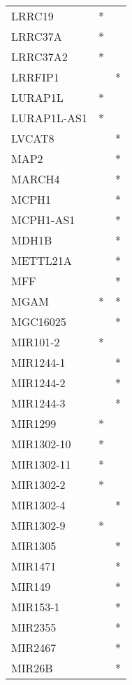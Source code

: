 \begin{longtable}{lcc}
LRRC19         &         * &         \\
LRRC37A        &         * &         \\
LRRC37A2       &         * &         \\
LRRFIP1        &           &       * \\
LURAP1L        &         * &         \\
LURAP1L-AS1    &         * &         \\
LVCAT8         &           &       * \\
MAP2           &           &       * \\
MARCH4         &           &       * \\
MCPH1          &           &       * \\
MCPH1-AS1      &           &       * \\
MDH1B          &           &       * \\
METTL21A       &           &       * \\
MFF            &           &       * \\
MGAM           &         * &       * \\
MGC16025       &           &       * \\
MIR101-2       &         * &         \\
MIR1244-1      &           &       * \\
MIR1244-2      &           &       * \\
MIR1244-3      &           &       * \\
MIR1299        &         * &         \\
MIR1302-10     &         * &         \\
MIR1302-11     &         * &         \\
MIR1302-2      &         * &         \\
MIR1302-4      &           &       * \\
MIR1302-9      &         * &         \\
MIR1305        &           &       * \\
MIR1471        &           &       * \\
MIR149         &           &       * \\
MIR153-1       &           &       * \\
MIR2355        &           &       * \\
MIR2467        &           &       * \\
MIR26B         &           &       * \\

\end{longtable}
